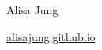 \documentclass[10pt, letterpaper]{article}
\newenvironment{highlightsforbulletentries}{
    \begin{itemize}[
        topsep=0.10 cm,
        parsep=0.10 cm,
        partopsep=0pt,
        itemsep=0pt,
        leftmargin=10pt
    ]
}{
    \end{itemize}
} %
\newenvironment{onecolentry}{
    \begin{adjustwidth}{
        0 cm + 0.00001 cm
    }{
        0 cm + 0.00001 cm
    }
}{
    \end{adjustwidth}
} %
\newenvironment{header}{
    \setlength{\topsep}{0pt}\par\kern\topsep\centering\linespread{1.5}
}{
    \par\kern\topsep
} %
\let\hrefWithoutArrow\href
\begin{document}
    \newcommand{\AND}{\unskip
        \cleaders\copy\ANDbox\hskip\wd\ANDbox
        \ignorespaces
    }
    \newsavebox\ANDbox
    \sbox\ANDbox{$|$}

    \begin{header}
        \fontsize{25 pt}{25 pt}\selectfont Alisa Jung

        \vspace{5 pt}

        \normalsize
        \mbox{\hrefWithoutArrow{https://alisajung.github.io/}{alisajung.github.io}}%
    \end{header}

    \vspace{5 pt - 0.3 cm}


    









    \newcommand{\sectionspace}{\vspace{.7cm}}
\end{document}
